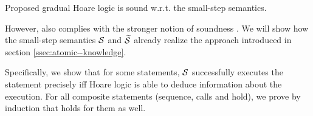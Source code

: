 Proposed gradual Hoare logic is sound w.r.t. the small-step semantics.

However, \gvlidf also complies with the stronger notion of soundness .
We will show how the small-step semantics $\mathcal{S}$ and $\widetilde{\mathcal{S}}$ already realize the approach introduced in section \ref{ssec:atomic--knowledge}.

Specifically, we show that for some statements, $\mathcal{S}$ successfully executes the statement precisely iff Hoare logic is able to deduce information about the execution.
For all composite statements (sequence, calls and hold), we prove by induction that  holds for them as well.



